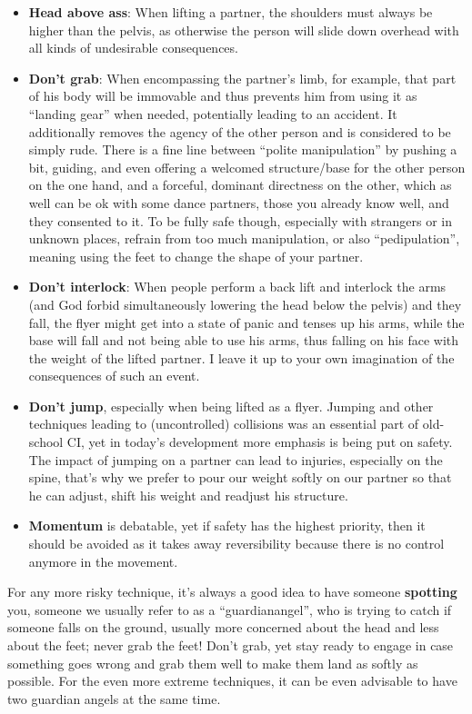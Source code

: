 \begin{itemize}
    \item \textbf{Head above ass}: When lifting a partner, the shoulders must always be higher than the pelvis, as otherwise the person will slide down overhead with all kinds of undesirable consequences.
    \item \textbf{Don't grab}: When encompassing the partner's limb, for example, that part of his body will be immovable and thus prevents him from using it as ``landing gear'' when needed, potentially leading to an accident.
    It additionally removes the agency of the other person and is considered to be simply rude.
    There is a fine line between ``polite manipulation'' by pushing a bit, guiding, and even offering a welcomed structure/base for the other person on the one hand, and a forceful, dominant directness on the other, which as well can be ok with some dance partners, those you already know well, and they consented to it.
    To be fully safe though, especially with strangers or in unknown places, refrain from too much manipulation, or also ``pedipulation'', meaning using the feet to change the shape of your partner.
    \item \textbf{Don't interlock}: When people perform a back lift and interlock the arms (and God forbid simultaneously lowering the head below the pelvis) and they fall, the flyer might get into a state of panic and tenses up his arms, while the base will fall and not being able to use his arms, thus falling on his face with the weight of the lifted partner.
    I leave it up to your own imagination of the consequences of such an event.
    \item \textbf{Don't jump}, especially when being lifted as a flyer.
    Jumping and other techniques leading to (uncontrolled) collisions was an essential part of old-school CI, yet in today's development more emphasis is being put on safety.
    The impact of jumping on a partner can lead to injuries, especially on the spine, that's why we prefer to pour our weight softly on our partner so that he can adjust, shift his weight and readjust his structure.
    \item \textbf{Momentum} is debatable, yet if safety has the highest priority, then it should be avoided as it takes away reversibility because there is no control anymore in the movement.
\end{itemize}

For any more risky technique, it's always a good idea to have someone \textbf{spotting} you, someone we usually refer to as a ``\gls{guardianangel}'', who is trying to catch if someone falls on the ground, usually more concerned about the head and less about the feet; never grab the feet!
Don't grab, yet stay ready to engage in case something goes wrong and grab them well to make them land as softly as possible.
For the even more extreme techniques, it can be even advisable to have two guardian angels at the same time.

